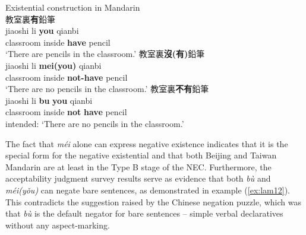 \documentclass[output=paper]{langscibook}
\begin{document}
\ea Existential construction in Mandarin \label{ex:lam11}\\
  \ea 教室裏\textbf{有}鉛筆 \label{ex:lam11a}\\
  	\gll jiaoshi	 li	\textbf{you} qianbi\\ 
  	classroom	inside	\textbf{have}	pencil\\
  	\glt `There are pencils in the classroom.'
  \ex 教室裏\textbf{沒(有)}鉛筆 \label{ex:lam11b}\\
  	\gll jiaoshi	 li \textbf{mei(you)} qianbi\\
  	classroom inside \textbf{not-have} pencil\\
  	\glt `There are no pencils in the classroom.'
  \ex 教室裏\textbf{不有}鉛筆 \label{ex:lam11c}\\
  	\gll *jiaoshi li \textbf{bu} \textbf{you} qianbi\\		
  	classroom	inside	\textbf{not} \textbf{have}	pencil\\
  	\glt intended: `There are no pencils in the classroom.'
\z \z 


The fact that \textit{méi} alone can express negative existence indicates that it is the special form for the negative existential and that both Beijing and Taiwan Mandarin are at least in the Type B stage of the NEC. Furthermore, the acceptability judgment survey results serve as evidence that both \textit{bù} and \textit{méi(yǒu)} can negate bare sentences, as demonstrated in example (\ref{ex:lam12}). This contradicts the suggestion raised by the Chinese negation puzzle, which was that \textit{bù} is the default negator for bare sentences – simple verbal declaratives without any aspect-marking.


\end{document}

